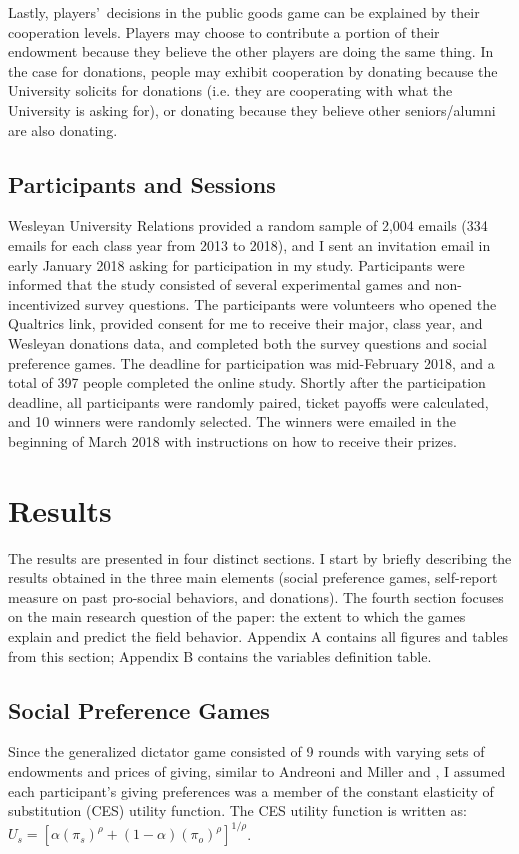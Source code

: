 \documentclass[12pt]{article}
\begin{document}
Lastly, players\rq \ decisions in the public goods game can be explained by their cooperation levels. Players may choose to contribute a portion of their endowment because they believe the other players are doing the same thing. In the case for donations, people may exhibit cooperation by donating because the University solicits for donations (i.e. they are cooperating with what the University is asking for), or donating because they believe other seniors/alumni are also donating.

	
\subsection{Participants and Sessions}

Wesleyan University Relations provided a random sample of 2,004 emails (334 emails for each class year from 2013 to 2018), and I sent an invitation email in early January 2018 asking for participation in my study. Participants were informed that the study consisted of several experimental games and non-incentivized survey questions. The participants were volunteers who opened the Qualtrics link, provided consent for me to receive their major, class year, and Wesleyan donations data, and completed both the survey questions and social preference games. The deadline for participation was mid-February 2018, and a total of 397 people completed the online study. Shortly after the participation deadline, all participants were randomly paired, ticket payoffs were calculated, and 10 winners were randomly selected. The winners were emailed in the beginning of March 2018 with instructions on how to receive their prizes.

\section{Results}
The results are presented in four distinct sections. I start by briefly describing the results obtained in the three main elements (social preference games, self-report measure on past pro-social behaviors, and donations). The fourth section focuses on the main research question of the paper: the extent to which the games explain and predict the field behavior. Appendix A contains all figures and tables from this section; Appendix B contains the variables definition table.

\subsection{Social Preference Games}
Since the generalized dictator game consisted of 9 rounds with varying sets of endowments and prices of giving, similar to Andreoni and Miller and \cite{fisman_kariv_markovits_2007}, I assumed each participant\rq s giving preferences was a member of the constant elasticity of substitution (CES) utility function.  The CES utility function is written as: \(U_{s} = [\alpha(\pi_{s})^{\rho} + (1-\alpha)(\pi_{o})^{\rho}]^{1/\rho}\).
\end{document}
